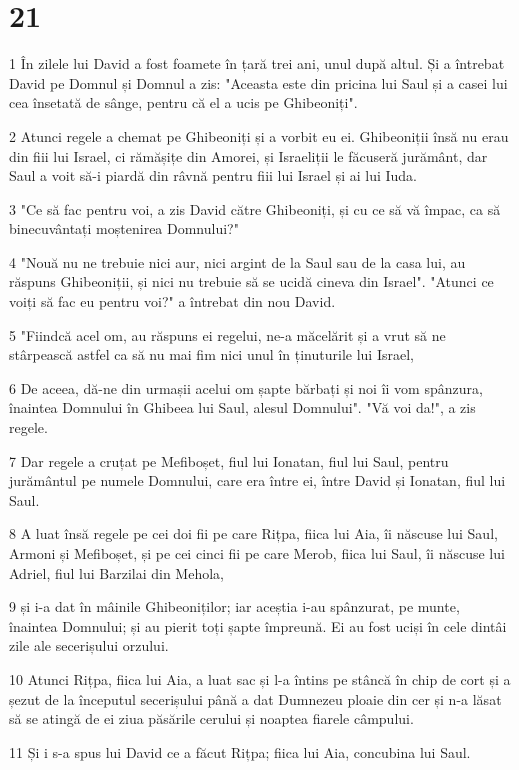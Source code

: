 \chapter{21}

\par 1 În zilele lui David a fost foamete în țară trei ani, unul după altul. Și a întrebat David pe Domnul și Domnul a zis: "Aceasta este din pricina lui Saul și a casei lui cea însetată de sânge, pentru că el a ucis pe Ghibeoniți".
\par 2 Atunci regele a chemat pe Ghibeoniți și a vorbit eu ei. Ghibeoniții însă nu erau din fiii lui Israel, ci rămășițe din Amorei, și Israeliții le făcuseră jurământ, dar Saul a voit să-i piardă din râvnă pentru fiii lui Israel și ai lui Iuda.
\par 3 "Ce să fac pentru voi, a zis David către Ghibeoniți, și cu ce să vă împac, ca să binecuvântați moștenirea Domnului?"
\par 4 "Nouă nu ne trebuie nici aur, nici argint de la Saul sau de la casa lui, au răspuns Ghibeoniții, și nici nu trebuie să se ucidă cineva din Israel". "Atunci ce voiți să fac eu pentru voi?" a întrebat din nou David.
\par 5 "Fiindcă acel om, au răspuns ei regelui, ne-a măcelărit și a vrut să ne stârpească astfel ca să nu mai fim nici unul în ținuturile lui Israel,
\par 6 De aceea, dă-ne din urmașii acelui om șapte bărbați și noi îi vom spânzura, înaintea Domnului în Ghibeea lui Saul, alesul Domnului". "Vă voi da!", a zis regele.
\par 7 Dar regele a cruțat pe Mefiboșet, fiul lui Ionatan, fiul lui Saul, pentru jurământul pe numele Domnului, care era între ei, între David și Ionatan, fiul lui Saul.
\par 8 A luat însă regele pe cei doi fii pe care Rițpa, fiica lui Aia, îi născuse lui Saul, Armoni și Mefiboșet, și pe cei cinci fii pe care Merob, fiica lui Saul, îi născuse lui Adriel, fiul lui Barzilai din Mehola,
\par 9 și i-a dat în mâinile Ghibeoniților; iar aceștia i-au spânzurat, pe munte, înaintea Domnului; și au pierit toți șapte împreună. Ei au fost uciși în cele dintâi zile ale secerișului orzului.
\par 10 Atunci Rițpa, fiica lui Aia, a luat sac și l-a întins pe stâncă în chip de cort și a șezut de la începutul secerișului până a dat Dumnezeu ploaie din cer și n-a lăsat să se atingă de ei ziua păsările cerului și noaptea fiarele câmpului.
\par 11 Și i s-a spus lui David ce a făcut Rițpa; fiica lui Aia, concubina lui Saul.
